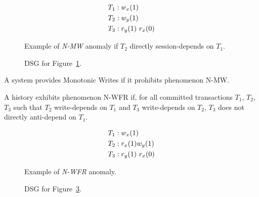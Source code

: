 \begin{figure}[H]
\begin{align*}
\small
T_1 &: w_x(1)\\
T_2 &: w_y(1)\\
T_3 &: r_y(1)~r_x(0)
\end{align*}
\caption{Example of \textit{N-MW} anomaly if $T_2$ directly session-depends on $T_1$.}
\label{fig:nmw-history}
\end{figure}

\begin{figure}[H]
\centering
{}
\caption{DSG for Figure~\ref{fig:nmw-history}.}
\label{fig:nmw-dsg}
\end{figure}


\begin{definition}
A system provides Monotonic Writes if it prohibits phenomenon N-MW.
\end{definition}

\begin{definition}
A history exhibits phenomenon N-WFR if, for all committed transactions
$T_1$, $T_2$, $T_3$ such that $T_2$ write-depends on $T_1$ and $T_3$
write-depends on $T_2$, $T_3$ does not directly anti-depend on $T_1$.
\end{definition}


\begin{figure}[H]
\begin{align*}
\small
T_1 &: w_x(1)\\
T_2 &: r_x(1) w_y(1)\\
T_3 &: r_y(1)~r_x(0)
\end{align*}
\caption{Example of \textit{N-WFR} anomaly.}
\label{fig:nwfr-history}
\end{figure}

\begin{figure}[H]
\centering
{}
\caption{DSG for Figure~\ref{fig:nwfr-history}.}
\label{fig:nwfr-dsg}
\end{figure}

